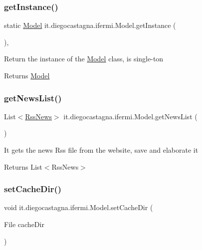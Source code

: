 \subsubsection{\texorpdfstring{getInstance()}{getInstance()}}
{\footnotesize\ttfamily static \mbox{\hyperlink{classit_1_1diegocastagna_1_1ifermi_1_1_model}{Model}} it.\+diegocastagna.\+ifermi.\+Model.\+get\+Instance (\begin{DoxyParamCaption}{ }\end{DoxyParamCaption})\hspace{0.3cm}{\ttfamily [inline]}, {\ttfamily [static]}}

Return the instance of the \mbox{\hyperlink{classit_1_1diegocastagna_1_1ifermi_1_1_model}{Model}} class, is single-\/ton \begin{DoxyReturn}{Returns}
\mbox{\hyperlink{classit_1_1diegocastagna_1_1ifermi_1_1_model}{Model}} 
\end{DoxyReturn}
\mbox{\label{classit_1_1diegocastagna_1_1ifermi_1_1_model_a41538c6de4e4fd7fe8a8eb668dffba1b}} 
\subsubsection{\texorpdfstring{getNewsList()}{getNewsList()}}
{\footnotesize\ttfamily List$<$\mbox{\hyperlink{classit_1_1diegocastagna_1_1ifermi_1_1_rss_news}{Rss\+News}}$>$ it.\+diegocastagna.\+ifermi.\+Model.\+get\+News\+List (\begin{DoxyParamCaption}{ }\end{DoxyParamCaption})\hspace{0.3cm}{\ttfamily [inline]}}

It gets the news Rss file from the website, save and elaborate it \begin{DoxyReturn}{Returns}
List$<$\+Rss\+News$>$ 
\end{DoxyReturn}
\mbox{\label{classit_1_1diegocastagna_1_1ifermi_1_1_model_a20afec0ef2cafa446628b2d7e852b34c}} 
\subsubsection{\texorpdfstring{setCacheDir()}{setCacheDir()}}
{\footnotesize\ttfamily void it.\+diegocastagna.\+ifermi.\+Model.\+set\+Cache\+Dir (\begin{DoxyParamCaption}\item[{File}]{cache\+Dir }\end{DoxyParamCaption})\hspace{0.3cm}{\ttfamily [inline]}}

